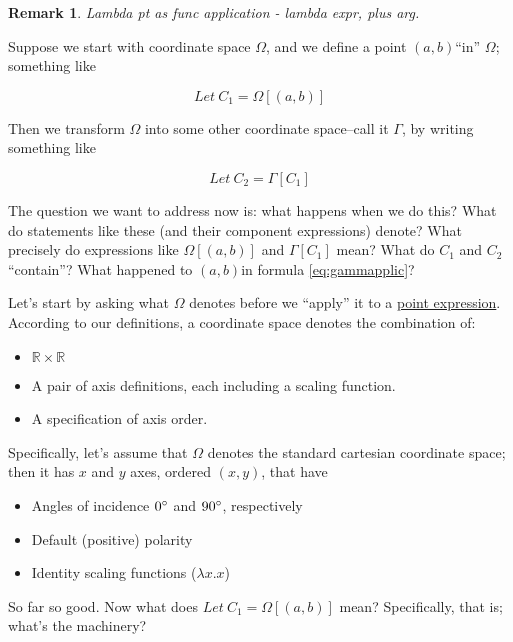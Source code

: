 \documentclass[reqno,12pt]{tufte-handout}
\numberwithin{equation}{subsection}
\numberwithin{equation}{subsection}
\newtheorem{remark}{Remark}
\newcommand\cspace{coordinate space}
\newcommand\Omg{\(\Omega\)}
\newcommand\sccs{standard cartesian coordinate space}
\newcommand\ab{\((a,b)\)}
\newcommand\xy{\((x,y)\)}
\begin{document}
\begin{remark}
  Lambda pt as func application - lambda expr, plus arg.
\end{remark}

Suppose we start with \cspace{} \Omg{}, and we define a point \ab ``in''
\Omg{}; something like

\begin{equation}
  \label{eq:omgapplic}
  Let\ C_1 = \Omega[(a,b)]
\end{equation}

Then we transform \Omg{} into some other \cspace{}--call it \(\Gamma\),
by writing something like

\begin{equation}
  \label{eq:gammapplic}
  Let\ C_2 = \Gamma[C_1]
\end{equation}

The question we want to address now is: what happens when we do this?
What do statements like these (and their component expressions)
denote?  What precisely do expressions like \(\Omega[(a,b)]\) and
\(\Gamma[C_1]\) mean? What do \(C_1\) and \(C_2\) ``contain''?  What
happened to \ab in formula \ref{eq:gammapplic}?

Let's start by asking what \Omg{} denotes before we ``apply'' it to a
\hyperref[subs:pointexprs]{point expression}.  According to our definitions, a \cspace{} denotes
the combination of:

\begin{itemize}
\item \(\mathds{R}\times\mathds{R}\)
\item A pair of axis definitions, each including a scaling function.
\item A specification of axis order.
\end{itemize}

Specifically, let's assume that \Omg{} denotes the \sccs{}; then it
has \(x\) and \(y\) axes, ordered \xy{}, that have

\begin{itemize}
\item Angles of incidence \(0\degree\) and \(90\degree\), respectively
\item Default (positive) polarity
\item Identity scaling functions (\(\lambda x.x\))
\end{itemize}

So far so good.  Now what does \(Let\ C_1=\Omega[(a,b)]\)
mean?  Specifically, that is; what's the machinery?
\end{document}

